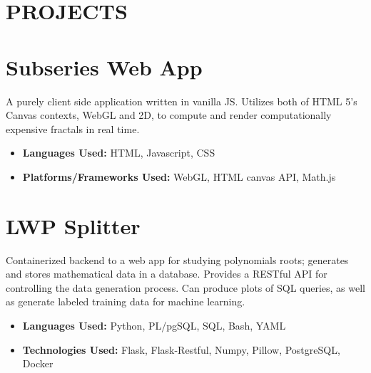 \documentclass[margin]{../res}
\begin{document}
  

\address{Email: raphaelreyna@protonmail.com \\
  Phone: (626) 384-1342 \\
  Site: www.raphaelreyna.works}
                           
                        
\begin{resume} 
\section{PROJECTS}
  
\normalsize{\section{Subseries Web App}}
A purely client side application written in vanilla JS.
Utilizes both of HTML 5's Canvas contexts, WebGL and 2D, to compute and render computationally expensive fractals in real
time.
\begin{multicols}{2}
\begin{itemize}
\item {\bf Languages Used: }\newline HTML, Javascript, CSS
  \columnbreak
\item {\bf Platforms/Frameworks Used: }\newline WebGL, HTML canvas API, Math.js
\end{itemize}
\end{multicols}

\normalsize{\section{LWP Splitter}}
Containerized backend to a web app for studying polynomials roots;
generates and stores mathematical data in a database.
Provides a RESTful API for controlling the data generation process.
Can produce plots of SQL queries, as well as generate labeled training data for machine learning.
\begin{multicols}{2}
\begin{itemize}
\item {\bf Languages Used: }\newline
  Python, PL/pgSQL, SQL, Bash, YAML
  \columnbreak
\item {\bf Technologies Used: } \newline
  Flask, Flask-Restful, Numpy, Pillow, PostgreSQL, Docker
\end{itemize}
\end{multicols}


\end{resume}
\end{document}
